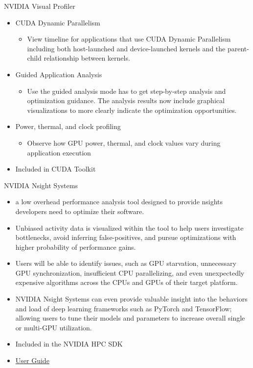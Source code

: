 \documentclass[10pt,t]{beamer}
\begin{document}
\begin{frame}[allowframebreaks]{NVIDIA Visual Profiler}
\begin{itemize}
    \begin{itemize}
  \item[] Use the command line profiler using environment variables to collect data from multiple systems and analyze the results in Visual Profiler
    \end{itemize}
  \item CUDA Dynamic Parallelism
    \begin{itemize}
  \item[] View timeline for applications that use CUDA Dynamic Parallelism including both host-launched and device-launched kernels and the parent-child relationship between kernels.
    \end{itemize}
  \item Guided Application Analysis
    \begin{itemize}
  \item[] Use the guided analysis mode has to get step-by-step analysis and optimization guidance. The analysis results now include graphical visualizations to more clearly indicate the optimization opportunities.
    \end{itemize}
  \item Power, thermal, and clock profiling
    \begin{itemize}
  \item[] Observe how GPU power, thermal, and clock values vary during application execution
    \end{itemize}
    \item Included in CUDA Toolkit
  \end{itemize}
\end{frame}

\begin{frame}{NVIDIA Nsight Systems}
  \begin{itemize}
  \item a low overhead performance analysis tool designed to provide nsights developers need to optimize their software.
  \item Unbiased activity data is visualized within the tool to help users investigate bottlenecks, avoid inferring false-positives, and pursue optimizations with higher probability of performance gains.
  \item Users will be able to identify issues, such as GPU starvation, unnecessary GPU synchronization, insufficient CPU parallelizing, and even unexpectedly expensive algorithms across the CPUs and GPUs of their target platform.
  \item NVIDIA Nsight Systems can even provide valuable insight into the behaviors and load of deep learning frameworks such as PyTorch and TensorFlow; allowing users to tune their models and parameters to increase overall single or multi-GPU utilization.
  \item Included in the NVIDIA HPC SDK
  \item \href{https://docs.nvidia.com/nsight-systems/UserGuide/index.html}{\color{lublue}User Guide}
  \end{itemize}
\end{frame}
\end{document}
